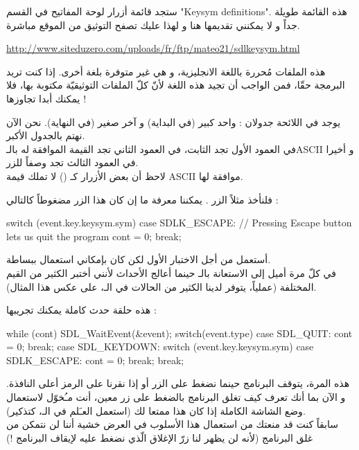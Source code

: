 ستجد قائمة أزرار لوحة المفاتيح في القسم
"\textenglish{Keysym definitions}".
هذه القائمة طويلة جداً و لا يمكنني تقديمها هنا و لهذا عليك تصفح التوثيق من الموقع مباشرة.

\url{http://www.siteduzero.com/uploads/fr/ftp/mateo21/sdlkeysym.html}

هذه الملفات مُحررة باللغة الانجليزية، و هي غير متوفرة بلغة أخرى. إذا كنت تريد البرمجة حقّا، فمن الواجب أن تجيد هذه اللغة لأنّ  كلّ الملفات التوثيقيّة مكتوبة بها، فلا يمكنك أبدا تجاوزها !

يوجد في اللائحة جدولان : واحد كبير (في البداية) و آخر صغير (في النهاية). نحن الآن نهتم بالجدول الأكبر.\\
في العمود الأول تجد الثابت، في العمود الثاني تجد القيمة الموافقة له بالـ\textenglish{ASCII}
و أخيرا في العمود الثالث تجد وصفاً للزر.\\
لاحظ أن بعض الأزرار كـ
()
لا تملك قيمة
\textenglish{ASCII}
موافقة لها.

فلنأخذ مثلاً الزر
.
يمكننا معرفة ما إن كان هذا الزر مضغوطاً كالتالي :

\begin{Csource}
switch (event.key.keysym.sym)
{
	case SDLK_ESCAPE: // Pressing Escape button lets us quit the program
	cont = 0;
	break;
}
\end{Csource}

\begin{information}
أستعمل
من أجل الاختبار الأول لكن كان بإمكاني استعمال
ببساطة.\\
في كلّ مرة أميل إلى الاستعانة بالـ
حينما أعالج الأحداث لأنني أختبر الكثير من القيم المختلفة (عملياً، يتوفر لدينا الكثير من الحالات في الـ،
على عكس هذا المثال).
\end{information}

هذه حلقة حدث كاملة يمكنك تجريبها :

\begin{Csource}
while (cont)
{
	SDL_WaitEvent(&event);
	switch(event.type)
	{
		case SDL_QUIT:
		cont = 0;
		break;
		case SDL_KEYDOWN:
		switch (event.key.keysym.sym)
		{
			case SDLK_ESCAPE: 
			cont = 0;
			break;
		}
		break;
	}
}
\end{Csource}

\begin{information}
هذه المرة، يتوقف البرنامج حينما نضغط على الزر
أو إذا نقرنا على الرمز
أعلى النافذة. و الآن بما أنك تعرف كيف تغلق البرنامج بالضغط على زر معين، أنت مـُخوّل لاستعمال وضع الشاشة الكاملة إذا كان هذا ممتعا لك (استعمل العـَلم
في الـ،
كتذكير).\\
سابقاً كنت قد منعتك من استعمال هذا الأسلوب في العرض خشية أننا لن نتمكن من غلق البرنامج (لأنه لن يظهر لنا زرّ الإغلاق الّذي نضغط عليه لإيقاف البرنامج !)
\end{information}


